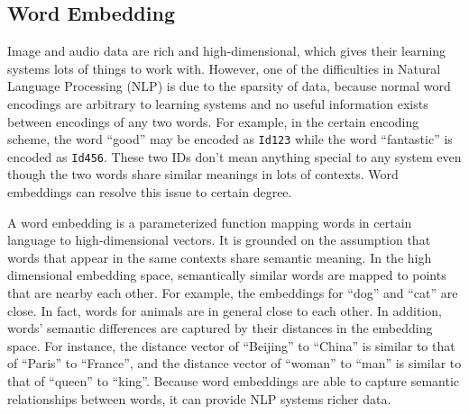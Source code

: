 \subsection{Word Embedding}

Image and audio data are rich and high-dimensional, which gives their learning systems lots of things to work with. However, one of the difficulties in Natural Language Processing (NLP) is due to the sparsity of data, because normal word encodings are arbitrary to learning systems and no useful information exists between encodings of any two words. For example, in the certain encoding scheme, the word ``good'' may be encoded as {\tt Id123} while the word ``fantastic'' is encoded as {\tt Id456}. These two IDs don't mean anything special to any system even though the two words share similar meanings in lots of contexts. Word embeddings can resolve this issue to certain degree.

A word embedding is a parameterized function mapping words in certain language to high-dimensional vectors. It is grounded on the assumption that words that appear in the same contexts share semantic meaning. In the high dimensional embedding space, semantically similar words are mapped to points that are nearby each other. For example, the embeddings for ``dog'' and ``cat'' are close. In fact, words for animals are in general close to each other. In addition, words' semantic differences are captured by their distances in the embedding space. For instance, the distance vector of ``Beijing'' to ``China'' is similar to that of ``Paris'' to ``France'', and the distance vector of ``woman'' to ``man'' is similar to that of ``queen'' to ``king''. Because word embeddings are able to capture semantic relationships between words, it can provide NLP systems richer data. 
